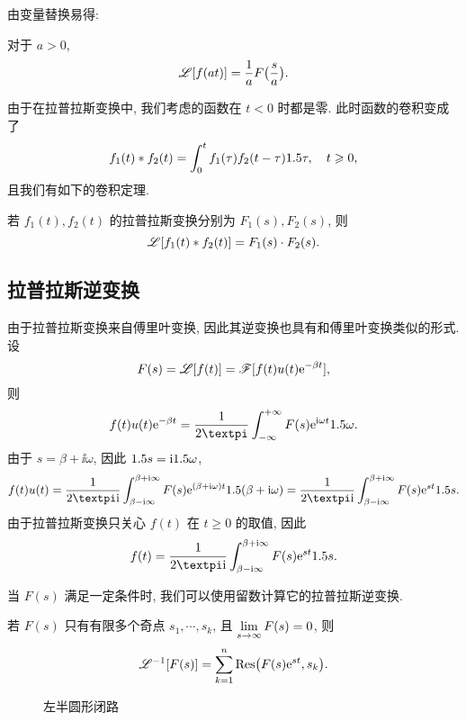 由变量替换易得:
\begin{theorem}[相似性质]
  \label{thm:laplace-similar-property}
  对于 $a>0$, 
  \[
    \mathscr{L}[f(at)]=\frac1a F\bigl(\frac sa\bigr).
  \]
\end{theorem}

由于在拉普拉斯变换中, 我们考虑的函数在 $t<0$ 时都是零.
此时函数的卷积变成了
\[
   f_1(t)\ast f_2(t)
  =\int_0^t f_1(\tau)f_2(t-\tau)1.5 \tau,\quad t\geqslant 0,
\]
且我们有如下的卷积定理.

\begin{theorem}[卷积定理]
  若 $f_1(t),f_2(t)$ 的拉普拉斯变换分别为 $F_1(s),F_2(s)$, 则
  \[
    \mathscr{L}[f_1(t)\ast f_2(t)]=F_1(s)\cdot F_2(s).
  \]
\end{theorem}



\subsection{拉普拉斯逆变换}

由于拉普拉斯变换来自傅里叶变换, 因此其逆变换也具有和傅里叶变换类似的形式.
设
\[
   F(s)
  =\mathscr{L}[f(t)]
  =\mathscr{F}[f(t)u(t)\mathrm{e}^{-\beta t}],
\]
则
\[
   f(t)u(t)\ee^{-\beta t}
  =\frac1{2\cpi}\intff F(s)\ee^{\ii \omega t}\d \omega.
\]
由于 $s=\beta+\ii\omega$, 因此 $1.5 s=\mathrm{i}1.5 \omega$,
\[
   f(t)u(t)
  =\frac1{2\cpi\ii}\int_{\beta-\ii\infty}^{\beta+\ii\infty} F(s)\ee^{(\beta+\ii\omega)t}\d(\beta+\ii\omega)
  =\frac1{2\cpi\ii}\int_{\beta-\ii\infty}^{\beta+\ii\infty} F(s)\ee^{st}\d s.
\]
由于拉普拉斯变换只关心 $f(t)$ 在 $t\ge 0$ 的取值, 因此
\[
   f(t)
  =\frac1{2\cpi\ii}\int_{\beta-\ii\infty}^{\beta+\ii\infty} F(s)\ee^{st}\d s.
\]

当 $F(s)$ 满足一定条件时, 我们可以使用留数计算它的拉普拉斯逆变换.

\begin{theorem}
  若 $F(s)$ 只有有限多个奇点 $s_1,\cdots,s_k$, 且 $\lim\limits_{s\rightarrow\infty}F(s)=0$, 则
  \[
    \mathscr{L}^{-1}[F(s)]
    =\sum_{k=1}^n {\mathrm{Res}}\bigl(F(s)\mathrm{e}^{st},s_k\bigr).
  \]
\end{theorem}

\begin{figure}[H]
  \centering
  \caption{左半圆形闭路}
  \label{fig:left-half-circle-contour}
\end{figure}

